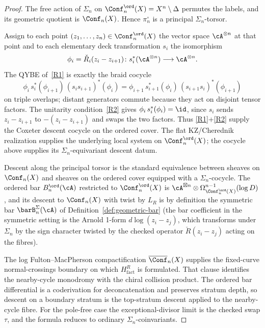 \begin{proof}
The free action of $\Sigma_n$ on
$\Conf_n^{\ord}(X)=X^n\setminus\Delta$ permutes the labels, and its
geometric quotient is $\Conf_n(X)$.  Hence $\pi_n^\circ$ is a
principal $\Sigma_n$-torsor.

Assign to each point
$(z_1,\dots,z_n) \in \Conf^{\ord}_n(X)$ the vector space
$\cA^{\otimes n}$ at that point and to each elementary deck
transformation $s_i$ the isomorphism
\[
\phi_i=\check R_i(z_i-z_{i+1})\colon
s_i^*(\cA^{\otimes n})\longrightarrow \cA^{\otimes n}.
\]
The QYBE of~\ref{R1} is exactly the braid cocycle
\[
\phi_i\,s_i^*(\phi_{i+1})\,(s_i s_{i+1})^*(\phi_i)
=
\phi_{i+1}\,s_{i+1}^*(\phi_i)\,(s_{i+1}s_i)^*(\phi_{i+1})
\]
on triple overlaps; distant generators commute because they act on
disjoint tensor factors. The unitarity condition~\ref{R2} gives
$\phi_i\,s_i^*(\phi_i)=\id$, since $s_i$ sends $z_i-z_{i+1}$ to
$-(z_i-z_{i+1})$ and swaps the two factors. Thus
\ref{R1}+\ref{R2} supply the Coxeter descent cocycle on the ordered
cover. The flat KZ/Cherednik realization supplies the underlying
local system on $\Conf^{\ord}_n(X)$; the cocycle above supplies its
$\Sigma_n$-equivariant descent datum.

Descent along the principal torsor is the standard equivalence between
sheaves on $\Conf_n(X)$ and sheaves on the ordered cover equipped
with a $\Sigma_n$-cocycle. The ordered bar $B^{\ord}_n(\cA)$ restricted to
$\Conf^{\ord}_n(X)$ is
$\cA^{\boxtimes n} \otimes \Omega^{n-1}_{\Conf^{\ord}_n(X)}(\log D)$,
and its descent to $\Conf_n(X)$ with twist by $L_R$ is by definition
the symmetric bar $\barB^{\Sigma}_n(\cA)$ of
Definition~\ref{def:geometric-bar} (the bar coefficient in the
symmetric setting is the Arnold 1-form $d\log(z_i - z_j)$, which
transforms under $\Sigma_n$ by the sign character twisted by
the checked operator $\check R(z_i-z_j)$ acting on the fibres).

The log Fulton--MacPherson compactification
$\overline{\Conf}_n(X)$ supplies the fixed-curve normal-crossings
boundary on which $H_{\mathrm{fact}}^{R}$ is formulated.  That clause
identifies the nearby-cycle monodromy with the chiral collision
product.  The ordered bar differential is a coderivation for
deconcatenation and preserves stratum depth, so descent on a boundary
stratum is the top-stratum descent applied to the nearby-cycle fibre.
For the pole-free case the exceptional-divisor limit is the checked
swap $\tau$, and
the formula reduces to ordinary $\Sigma_n$-coinvariants.
\end{proof}

